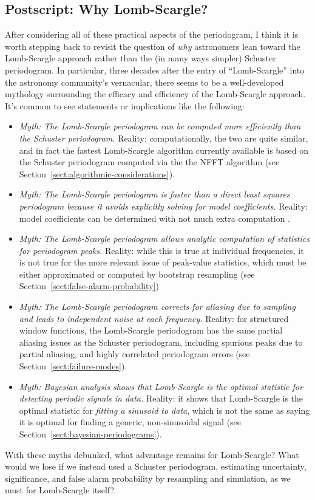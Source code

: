 \documentclass[preprint]{aastex}
\newcommand{\Sect}[1]{Section~\ref{sect:#1}}
\newcommand{\sect}[1]{\Sect{#1}}
\begin{document}
\subsection{Postscript: Why Lomb-Scargle?}
After considering all of these practical aspects of the periodogram,
I think it is worth stepping back to
revisit the question of {\it why} astronomers lean toward the
Lomb-Scargle approach rather than the (in many ways simpler) Schuster
periodogram.
In particular, three decades after the entry of ``Lomb-Scargle'' into the
astronomy community's vernacular, there seems to be a well-developed
mythology surrounding the efficacy and efficiency of the Lomb-Scargle approach.
It's common to see statements or implications like the following:
\begin{itemize}
  \item {\it Myth: The Lomb-Scargle periodogram can be computed more efficiently
    than the Schuster periodogram.} Reality: computationally, the two
    are quite similar, and in fact the fastest Lomb-Scargle algorithm currently
    available is based on the Schuster periodogram computed via the
    the NFFT algorithm (see \sect{algorithmic-considerations}).
  \item {\it Myth: The Lomb-Scargle periodogram is faster than a direct
    least squares periodogram because it avoids explicitly solving for
    model coefficients.}
    Reality: model coefficients can be determined with not much extra
    computation \citep[see discussion in][]{ICVG2014}.
  \item {\it Myth: The Lomb-Scargle periodogram allows analytic computation of
    statistics for periodogram peaks.} Reality: while this is true at
    individual frequencies, it is not true for the more relevant issue of
    peak-value statistics, which must be either approximated or computed by
    bootstrap resampling (see \sect{false-alarm-probability})
  \item {\it Myth: The Lomb-Scargle periodogram corrects for aliasing due to
    sampling and leads to independent noise at each frequency.}
    Reality: for structured window functions, the Lomb-Scargle
    periodogram has the same partial aliasing issues as the Schuster
    periodogram, including spurious peaks due to partial aliasing, and
    highly correlated periodogram errors (see \sect{failure-modes}).
  \item {\it Myth: Bayesian analysis shows that Lomb-Scargle is the optimal
    statistic for detecting periodic signals in data.} Reality: it
    shows that Lomb-Scargle is the optimal statistic for
    {\it fitting a sinusoid to data}, which is not the same as saying it
    is optimal for finding a generic, non-sinusoidal signal
    (see \sect{bayesian-periodograms}).
\end{itemize}
With these myths debunked, what advantage remains for Lomb-Scargle?
What would we lose if we instead used a Schuster periodogram,
estimating uncertainty, significance, and false alarm probability by
resampling and simulation, as we must for Lomb-Scargle itself?
\end{document}

